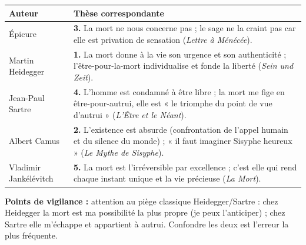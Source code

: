\documentclass[11pt]{article}
\begin{document}
\begin{corrige}
\begin{center}
\begin{tabularx}{\linewidth}{|l|X|}\hline
\textbf{Auteur} & \textbf{Thèse correspondante} \\ \hline
Épicure & \textbf{3.} La mort ne nous concerne pas ; le sage ne la craint pas car elle est privation de sensation (\emph{Lettre à Ménécée}). \\ \hline
Martin Heidegger & \textbf{1.} La mort donne à la vie son urgence et son authenticité ; l'être-pour-la-mort individualise et fonde la liberté (\emph{Sein und Zeit}). \\ \hline
Jean-Paul Sartre & \textbf{4.} L'homme est condamné à être libre ; la mort me fige en être-pour-autrui, elle est « le triomphe du point de vue d'autrui » (\emph{L'Être et le Néant}). \\ \hline
Albert Camus & \textbf{2.} L'existence est absurde (confrontation de l'appel humain et du silence du monde) ; « il faut imaginer Sisyphe heureux » (\emph{Le Mythe de Sisyphe}). \\ \hline
Vladimir Jankélévitch & \textbf{5.} La mort est l'irréversible par excellence ; c'est elle qui rend chaque instant unique et la vie précieuse (\emph{La Mort}). \\ \hline
\end{tabularx}
\end{center}
\textbf{Points de vigilance :} attention au piège classique Heidegger/Sartre : chez Heidegger la mort est ma possibilité la plus propre (je peux l'anticiper) ; chez Sartre elle m'échappe et appartient à autrui. Confondre les deux est l'erreur la plus fréquente.
\end{corrige}
\end{document}
